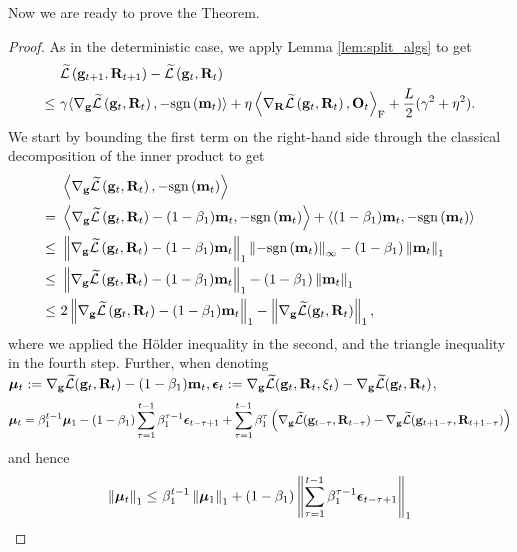 {Now we are ready to prove the Theorem.

\begin{proof}

As in the deterministic case, we apply Lemma \ref{lem:split_algs} to get
\begin{align}\begin{split}\label{eq:descent_ineq}
    &\ \Ft\pare{\gtp, \Rtp} - \Ft\pare{\gt, \Rt} \\
    \leq &\  
    \gamma \langle \nabla_\g \Ft\pare{\gt,\Rt}, - \sgn\pare{\mt}\rangle
    + \eta \innerF{\nabla_\Rbf \Ft\pare{\gt,\Rt}}{\Ot} + \frac{L}{2}(\gamma^2 + \eta^2).
\end{split}\end{align}
We start by bounding the first term on the right-hand side through the classical decomposition of the inner product \citep[see e.g.][]{MomentumImprovesNormalized2020cutkosky} to get
\begin{align*}
    &\ \left\langle \nabla_\g \Ft\pare{\gt,\Rt}, - \sgn\pare{\mt}\right\rangle\\
    =&\  \left\langle \nabla_\g \Ft\pare{\gt,\Rt} - (1-\beta_1)\mt, - \sgn\pare{\mt}\right\rangle 
    + \left\langle (1-\beta_1)\mt, - \sgn\pare{\mt}\right\rangle\\
    \leq &\ \norm{\nabla_\g \Ft\pare{\gt,\Rt} - (1-\beta_1)\mt}_1 \norm{-\sgn\pare{\mt}}_\infty - (1-\beta_1)\norm{\mt}_1 \\
    \leq &\ \norm{\nabla_\g \Ft\pare{\gt,\Rt} - (1-\beta_1)\mt}_1 - (1-\beta_1)\norm{\mt}_1\\
    \leq &\ 2\norm{\nabla_\g \Ft\pare{\gt,\Rt} - (1-\beta_1)\mt}_1 - \norm{\gradgt}_1,
\end{align*}
where we applied the Hölder inequality in the second, and the triangle inequality in the fourth step. Further, when denoting $\mubf_t := \gradgt - (1-\beta_1)\mt, \eps_t := \nabla_\g \Ft(\gt, \Rt, \xi_t) - \gradgt$, 
\begin{equation*}
    \mubf_t = 
    \beta_1^{t-1} \mubf_1 
    - (1-\beta_1) \sum_{\tau=1}^{t-1} \beta_1^{\tau - 1} \eps_{t- \tau + 1}
    + \sum_{\tau=1}^{t-1} \beta_1^{\tau} \pare{\nabla_\g \Ft(\g_{t - \tau}, \Rbf_{t-\tau}) - \nabla_\g \Ft(\g_{t + 1 - \tau}, \Rbf_{t + 1 - \tau})}
\end{equation*}
and hence
\begin{align}\label{eq:mu_decomposition}\begin{split}
    \norm{\mubf_t}_1 \leq
    &\ \beta_1^{t-1} \norm{\mubf_1}_1 
    + (1-\beta_1) \norm{\sum_{\tau=1}^{t-1} \beta_1^{\tau - 1} \eps_{t- \tau + 1}}_1\\

\end{split}
\end{align}
\end{proof}}
